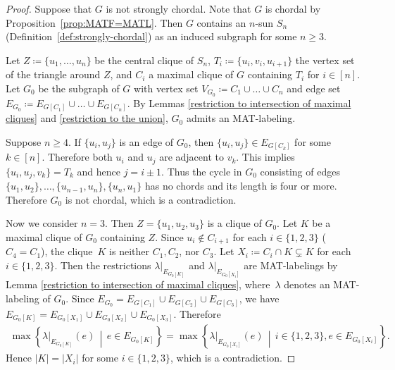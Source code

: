 \begin{proof}
Suppose that $ G $ is not strongly chordal. 
Note that $G$ is chordal by Proposition~\ref{prop:MATF=MATL}.
Then $ G $ contains an $ n $-sun $ S_{n} $ (Definition~\ref{def:strongly-chordal}) as an induced subgraph for some $ n \geq 3 $.

Let $ Z \coloneqq \{u_{1}, \dots, u_{n}\} $ be the central clique of $ S_{n} $, $ T_{i} \coloneqq \{u_{i}, v_{i}, u_{i+1}\} $ the vertex set of the triangle around $ Z $, and $ C_{i} $ a maximal clique of $ G $ containing $ T_{i} $ for $ i \in [n]$. 
Let $ G_{0} $ be the subgraph of $ G $ with vertex set $ V_{G_{0}} \coloneqq C_{1} \cup \dots \cup C_{n} $ and edge set $ E_{G_{0}} \coloneqq E_{G[C_{1}]} \cup \dots \cup E_{G[C_{n}]} $. 
By Lemmas \ref{restriction to intersection of maximal cliques} and \ref{restriction to the union}, $ G_{0} $ admits an MAT-labeling. 

Suppose $ n \geq 4 $. 
If $ \{u_{i}, u_{j}\} $ is an edge of $ G_{0} $, then $ \{u_{i}, u_{j}\} \in E_{G[C_{k}]} $ for some $ k \in [n]$. 
Therefore  both $ u_{i} $ and $ u_{j} $ are adjacent to $ v_{k} $. 
This implies $ \{u_{i}, u_{j}, v_{k}\} = T_{k} $ and hence $ j = i \pm 1 $. 
Thus the cycle in $ G_{0} $ consisting of edges $ \{u_{1}, u_{2}\}, \dots, \{u_{n-1}, u_{n}\}, \{u_{n}, u_{1}\} $ has no chords and its length is four or more. 
Therefore $ G_{0} $ is not chordal, which is a contradiction. 

Now we consider $ n = 3 $. 
Then $ Z = \{u_{1}, u_{2}, u_{3}\} $ is a clique of $ G_{0} $. 
Let $ K $ be a maximal clique of $ G_{0} $ containing $ Z $. 
Since $ u_{i} \not\in C_{i+1} $ for each $ i \in \{1,2,3\} $  ($C_4=C_1$), the clique~$ K $ is neither $ C_{1}, C_{2} $, nor $ C_{3} $. 
Let $ X_{i} \coloneqq C_{i} \cap K \subsetneq K$ for each $ i \in \{1,2,3\} $. 
Then the restrictions $ \lambda|_{E_{G_{0}[K]}} $ and $ \lambda|_{E_{G_{0}[X_{i}]}}$ are MAT-labelings by Lemma \ref{restriction to intersection of maximal cliques}, where~$ \lambda $ denotes an MAT-labeling of $ G_{0} $. 
Since $ E_{G_{0}} = E_{G[C_{1}]} \cup E_{G[C_{2}]} \cup E_{G[C_{3}]} $, we have $ E_{G_{0}[K]} = E_{G_{0}[X_{1}]} \cup E_{G_{0}[X_{2}]} \cup E_{G_{0}[X_{3}]} $. 
Therefore 
\begin{align*}
\max\left\{\lambda|_{E_{G_{0}[K]}}(e) \, \middle| \,  e \in E_{G_{0}[K]}\right\}
= \max\left\{ \lambda|_{E_{G_{0}[X_{i}]}}(e) \, \middle| \, i \in \{1,2,3\}, e \in E_{G_{0}[X_{i}]}\right\}. 
\end{align*}
Hence $ |K| = |X_{i}| $ for some $ i \in \{1,2,3\} $, which is a contradiction. 
\end{proof}
